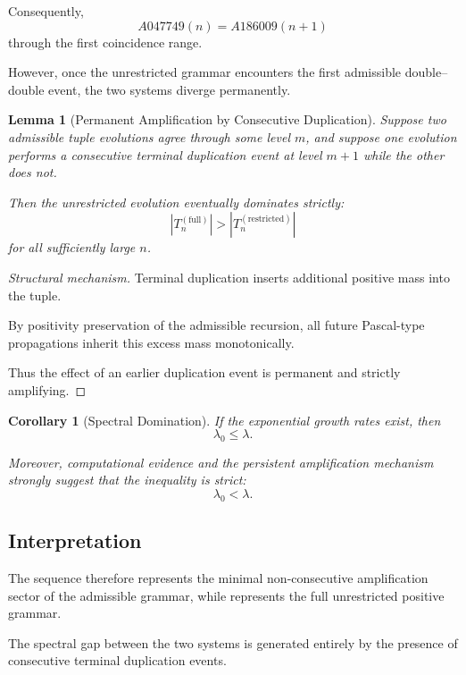 \documentclass[12pt, oneside]{article}
\numberwithin{equation}{section}
\theoremstyle{definition}
\theoremstyle{plain}
\newtheorem{lemma}[theorem]{Lemma}
\newtheorem{corollary}[theorem]{Corollary}
\theoremstyle{remark}
\begin{document}
Consequently,
\[
A047749(n)=A186009(n+1)
\]
through the first coincidence range.

However, once the unrestricted grammar encounters the first admissible
double--double event, the two systems diverge permanently.


\begin{lemma}[Permanent Amplification by Consecutive Duplication]
\label{lem:permanent-amplification}
Suppose two admissible tuple evolutions agree through some level \(m\),
and suppose one evolution performs a consecutive terminal duplication
event at level \(m+1\) while the other does not.

Then the unrestricted evolution eventually dominates strictly:
\[
|T_n^{(\mathrm{full})}|
>
|T_n^{(\mathrm{restricted})}|
\]
for all sufficiently large \(n\).
\end{lemma}

\begin{proof}[Structural mechanism]
Terminal duplication inserts additional positive mass into the tuple.

By positivity preservation of the admissible recursion, all future
Pascal-type propagations inherit this excess mass monotonically.

Thus the effect of an earlier duplication event is permanent and
strictly amplifying.
\end{proof}

\begin{corollary}[Spectral Domination]
If the exponential growth rates exist, then
\[
\lambda_0 \le \lambda.
\]

Moreover, computational evidence and the persistent amplification
mechanism strongly suggest that the inequality is strict:
\[
\lambda_0 < \lambda.
\]
\end{corollary}

\subsection{Interpretation}

The sequence  therefore represents the minimal
non-consecutive amplification sector of the admissible grammar, while
 represents the full unrestricted positive grammar.

The spectral gap between the two systems is generated entirely by the
presence of consecutive terminal duplication events.
\end{document}
